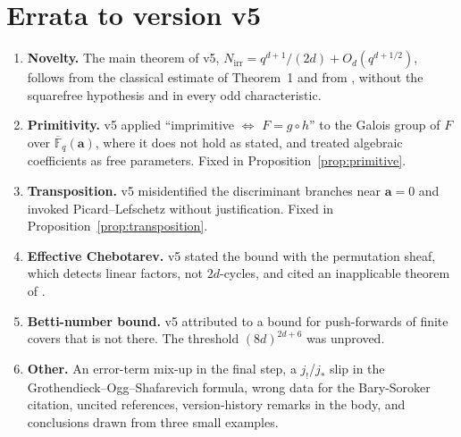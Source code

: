 \documentclass[11pt,a4paper]{article}
\theoremstyle{definition}
\theoremstyle{remark}
\newcommand{\Fqbar}{\overline{\mathbb{F}}_q}
\newcommand{\Nirr}{N_{\mathrm{irr}}}
\newcommand{\ba}{\mathbf{a}}
\begin{document}
\appendix
\section{Errata to version v5}\label{app:errata}
\begin{enumerate}[label=E\arabic*.,leftmargin=*]
\item \textbf{Novelty.} The main theorem of v5, $\Nirr=q^{d+1}/(2d)+O_d(q^{d+1/2})$, follows from the
      classical estimate of Theorem~1 and from \cite[Thm.~2.3]{BBR2015}, without the squarefree
      hypothesis and in every odd characteristic.
\item \textbf{Primitivity.} v5 applied ``imprimitive $\Leftrightarrow$ $F=g\circ h$'' to the Galois
      group of $F$ over $\Fqbar(\ba)$, where it does not hold as stated, and treated algebraic
      coefficients as free parameters. Fixed in Proposition~\ref{prop:primitive}.
\item \textbf{Transposition.} v5 misidentified the discriminant branches near $\ba=0$ and invoked
      Picard--Lefschetz without justification. Fixed in Proposition~\ref{prop:transposition}.
\item \textbf{Effective Chebotarev.} v5 stated the bound with the permutation sheaf, which detects
      linear factors, not $2d$-cycles, and cited an inapplicable theorem of \cite{Katz1988}.
\item \textbf{Betti-number bound.} v5 attributed to \cite[Thm.~12]{Katz2001} a bound for push-forwards
      of finite covers that is not there. The threshold $(8d)^{2d+6}$ was unproved.
\item \textbf{Other.} An error-term mix-up in the final step, a $j_!$/$j_*$ slip in the
      Grothendieck--Ogg--Shafarevich formula, wrong data for the Bary-Soroker citation, uncited
      references, version-history remarks in the body, and conclusions drawn from three small examples.
\end{enumerate}

\end{document}
